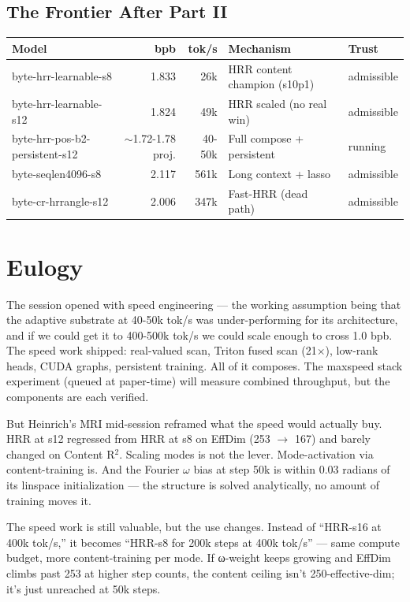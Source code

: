 \documentclass[11pt,a4paper]{report}
\begin{document}
\section{The Frontier After Part II}

\begin{center}
\begin{tabular}{lrrll}
\toprule
Model & bpb & tok/s & Mechanism & Trust \\
\midrule
byte-hrr-learnable-s8 & 1.833 & 26k & HRR content champion (s10p1) & admissible \\
byte-hrr-learnable-s12 & 1.824 & 49k & HRR scaled (no real win) & admissible \\
byte-hrr-pos-b2-persistent-s12 & $\sim$1.72-1.78 proj. & 40-50k & Full compose + persistent & running \\
byte-seqlen4096-s8 & 2.117 & 561k & Long context + lasso & admissible \\
byte-cr-hrrangle-s12 & 2.006 & 347k & Fast-HRR (dead path) & admissible \\
\bottomrule
\end{tabular}
\end{center}


\chapter{Eulogy}

The session opened with speed engineering --- the working assumption being that the adaptive substrate at 40-50k tok/s was under-performing for its architecture, and if we could get it to 400-500k tok/s we could scale enough to cross 1.0 bpb. The speed work shipped: real-valued scan, Triton fused scan (21$\times$), low-rank heads, CUDA graphs, persistent training. All of it composes. The maxspeed stack experiment (queued at paper-time) will measure combined throughput, but the components are each verified.

But Heinrich's MRI mid-session reframed what the speed would actually buy. HRR at s12 regressed from HRR at s8 on EffDim (253 $\to$ 167) and barely changed on Content R$^2$. Scaling modes is not the lever. Mode-activation via content-training is. And the Fourier $\omega$ bias at step 50k is within 0.03 radians of its linspace initialization --- the structure is solved analytically, no amount of training moves it.

The speed work is still valuable, but the use changes. Instead of ``HRR-s16 at 400k tok/s,'' it becomes ``HRR-s8 for 200k steps at 400k tok/s'' --- same compute budget, more content-training per mode. If ω-weight keeps growing and EffDim climbs past 253 at higher step counts, the content ceiling isn't 250-effective-dim; it's just unreached at 50k steps.
\end{document}

